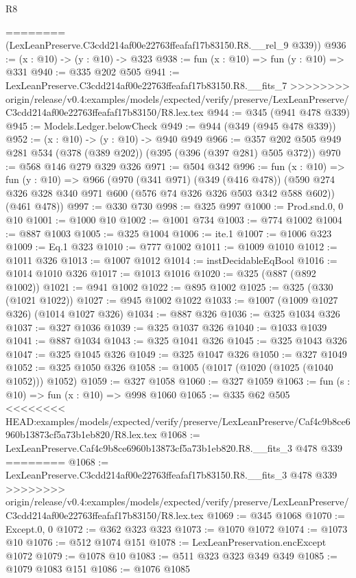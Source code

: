 \begin{lexlean}{R8}
\begin{coremodule}
{{{{{{{{{{{{{{{{{{{{{{{========
      (LexLeanPreserve.C3cdd214af00e22763ffeafaf17b83150.R8.__rel_9 @339))
@936 := (x : @10) -> (y : @10) -> @323
@938 := fun (x : @10) => fun (y : @10) => @331
@940 := @335 @202 @505
@941 := LexLeanPreserve.C3cdd214af00e22763ffeafaf17b83150.R8.__fits_7
>>>>>>>> origin/release/v0.4:examples/models/expected/verify/preserve/LexLeanPreserve/C3cdd214af00e22763ffeafaf17b83150/R8.lex.tex
@944 := @345 (@941 @478 @339)
@945 := Models.Ledger.belowCheck
@949 := @944 (@349 (@945 @478 @339))
@952 := (x : @10) -> (y : @10) -> @940 @949
@966 := @357 @202 @505 @949 @281 @534 (@378 (@389 @202)) (@395 (@396 (@397 @281) @505 @372))
@970 := @568 @146 @279 @329 @326
@971 := @504 @342
@996 := fun (x : @10) =>
  fun (y : @10) =>
  @966
    (@970
      (@341 @971)
      (@349 (@416 @478))
      (@590 @274 @326 @328 @340 @971 @600 (@576 @74 @326 @326 @503 @342 @588 @602))
      (@461 @478))
@997 := @330 @730
@998 := @325 @997
@1000 := Prod.snd.{0, 0} @10
@1001 := @1000 @10
@1002 := @1001 @734
@1003 := @774 @1002
@1004 := @887 @1003
@1005 := @325 @1004
@1006 := ite.{1}
@1007 := @1006 @323
@1009 := Eq.{1} @323
@1010 := @777 @1002
@1011 := @1009 @1010
@1012 := @1011 @326
@1013 := @1007 @1012
@1014 := instDecidableEqBool
@1016 := @1014 @1010 @326
@1017 := @1013 @1016
@1020 := @325 (@887 (@892 @1002))
@1021 := @941 @1002
@1022 := @895 @1002
@1025 := @325 (@330 (@1021 @1022))
@1027 := @945 @1002 @1022
@1033 := @1007 (@1009 @1027 @326) (@1014 @1027 @326)
@1034 := @887 @326
@1036 := @325 @1034 @326
@1037 := @327 @1036
@1039 := @325 @1037 @326
@1040 := @1033 @1039
@1041 := @887 @1034
@1043 := @325 @1041 @326
@1045 := @325 @1043 @326
@1047 := @325 @1045 @326
@1049 := @325 @1047 @326
@1050 := @327 @1049
@1052 := @325 @1050 @326
@1058 := @1005 (@1017 (@1020 (@1025 (@1040 @1052))) @1052)
@1059 := @327 @1058
@1060 := @327 @1059
@1063 := fun (s : @10) => fun (x : @10) => @998 @1060
@1065 := @335 @62 @505
<<<<<<<< HEAD:examples/models/expected/verify/preserve/LexLeanPreserve/Caf4c9b8ce6960b13873cf5a73b1eb820/R8.lex.tex
@1068 := LexLeanPreserve.Caf4c9b8ce6960b13873cf5a73b1eb820.R8.__fits_3 @478 @339
========
@1068 := LexLeanPreserve.C3cdd214af00e22763ffeafaf17b83150.R8.__fits_3 @478 @339
>>>>>>>> origin/release/v0.4:examples/models/expected/verify/preserve/LexLeanPreserve/C3cdd214af00e22763ffeafaf17b83150/R8.lex.tex
@1069 := @345 @1068
@1070 := Except.{0, 0}
@1072 := @362 @323 @323
@1073 := @1070 @1072
@1074 := @1073 @10
@1076 := @512 @1074 @151
@1078 := LexLeanPreservation.encExcept @1072
@1079 := @1078 @10
@1083 := @511 @323 @323 @349 @349
@1085 := @1079 @1083 @151
@1086 := @1076 @1085
}}}}}}}}}}}}}}}}}}}}}}}
\end{coremodule}
\end{lexlean}
